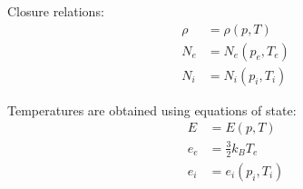 Closure relations:
\begin{align}
    \rho &= \rho(p,T) \\
    N_e &= N_e(p_e,T_e) \\
    N_i &= N_i(p_i,T_i)
\end{align}

Temperatures are obtained using equations of state:
\begin{align}
    E &= E(p,T) \\
    e_e &= \frac{3}{2} k_BT_e \\
    e_i &= e_i(p_i, T_i)
\end{align}